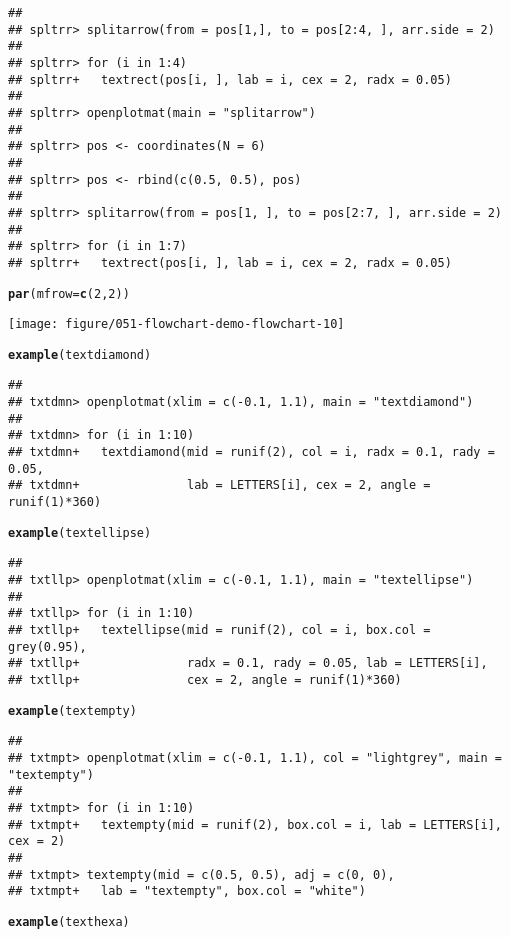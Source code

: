 \documentclass{article}\usepackage[]{graphicx}\usepackage[]{xcolor}
\makeatletter
\def\maxwidth{ %
  \ifdim\Gin@nat@width>\linewidth
    \linewidth
  \else
    \Gin@nat@width
  \fi
}
\newcommand{\hlnum}[1]{\textcolor[rgb]{0.686,0.059,0.569}{#1}}%
\newcommand{\hldef}[1]{\textcolor[rgb]{0.345,0.345,0.345}{#1}}%
\newcommand{\hlkwc}[1]{\textcolor[rgb]{0.333,0.667,0.333}{#1}}%
\newcommand{\hlkwd}[1]{\textcolor[rgb]{0.737,0.353,0.396}{\textbf{#1}}}%
\newenvironment{kframe}{%
 \def\at@end@of@kframe{}%
 \ifinner\ifhmode%
  \def\at@end@of@kframe{\end{minipage}}%
  \begin{minipage}{\columnwidth}%
 \fi\fi%
 \def\FrameCommand##1{\hskip\@totalleftmargin \hskip-\fboxsep
 \colorbox{shadecolor}{##1}\hskip-\fboxsep
     \hskip-\linewidth \hskip-\@totalleftmargin \hskip\columnwidth}%
 \MakeFramed {\advance\hsize-\width
   \@totalleftmargin\z@ \linewidth\hsize
   \@setminipage}}%
 {\par\unskip\endMakeFramed%
 \at@end@of@kframe}
\newenvironment{knitrout}{}{} %
\makeatother
\begin{document}
\begin{knitrout}
\begin{kframe}
\begin{verbatim}
## 
## spltrr> splitarrow(from = pos[1,], to = pos[2:4, ], arr.side = 2)
## 
## spltrr> for (i in 1:4) 
## spltrr+   textrect(pos[i, ], lab = i, cex = 2, radx = 0.05)
## 
## spltrr> openplotmat(main = "splitarrow")
## 
## spltrr> pos <- coordinates(N = 6)
## 
## spltrr> pos <- rbind(c(0.5, 0.5), pos)
## 
## spltrr> splitarrow(from = pos[1, ], to = pos[2:7, ], arr.side = 2)
## 
## spltrr> for (i in 1:7)
## spltrr+   textrect(pos[i, ], lab = i, cex = 2, radx = 0.05)
\end{verbatim}
\begin{alltt}
\hlkwd{par}\hldef{(}\hlkwc{mfrow} \hldef{=} \hlkwd{c}\hldef{(}\hlnum{2}\hldef{,} \hlnum{2}\hldef{))}
\end{alltt}
\end{kframe}
\texttt{[image: figure/051-flowchart-demo-flowchart-10]} 
\begin{kframe}\begin{alltt}
\hlkwd{example}\hldef{(textdiamond)}
\end{alltt}
\begin{verbatim}
## 
## txtdmn> openplotmat(xlim = c(-0.1, 1.1), main = "textdiamond")
## 
## txtdmn> for (i in 1:10) 
## txtdmn+   textdiamond(mid = runif(2), col = i, radx = 0.1, rady = 0.05,
## txtdmn+               lab = LETTERS[i], cex = 2, angle = runif(1)*360)
\end{verbatim}
\begin{alltt}
\hlkwd{example}\hldef{(textellipse)}
\end{alltt}
\begin{verbatim}
## 
## txtllp> openplotmat(xlim = c(-0.1, 1.1), main = "textellipse")
## 
## txtllp> for (i in 1:10) 
## txtllp+   textellipse(mid = runif(2), col = i, box.col = grey(0.95),
## txtllp+               radx = 0.1, rady = 0.05, lab = LETTERS[i],
## txtllp+               cex = 2, angle = runif(1)*360)
\end{verbatim}
\begin{alltt}
\hlkwd{example}\hldef{(textempty)}
\end{alltt}
\begin{verbatim}
## 
## txtmpt> openplotmat(xlim = c(-0.1, 1.1), col = "lightgrey", main = "textempty")
## 
## txtmpt> for (i in 1:10) 
## txtmpt+   textempty(mid = runif(2), box.col = i, lab = LETTERS[i], cex = 2)
## 
## txtmpt> textempty(mid = c(0.5, 0.5), adj = c(0, 0), 
## txtmpt+   lab = "textempty", box.col = "white")
\end{verbatim}
\begin{alltt}
\hlkwd{example}\hldef{(texthexa)}

\end{alltt}
\end{kframe}
\end{knitrout}
\end{document}
